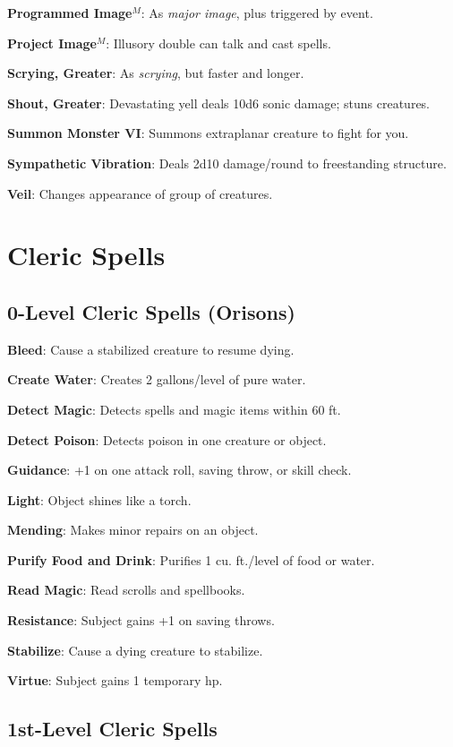 \textbf{Programmed Image}\(^{M}\): As \textit{major image}, plus triggered by event.

\textbf{Project Image}\(^{M}\): Illusory double can talk and cast spells.

\textbf{Scrying, Greater}: As \textit{scrying}, but faster and longer.

\textbf{Shout, Greater}: Devastating yell deals 10d6 sonic damage; stuns creatures.

\textbf{Summon Monster VI}: Summons extraplanar creature to fight for you.

\textbf{Sympathetic Vibration}: Deals 2d10 damage/round to freestanding structure.

\textbf{Veil}: Changes appearance of group of creatures.

\section{Cleric Spells}


\subsection{0-Level Cleric Spells (Orisons)}


\textbf{Bleed}: Cause a stabilized creature to resume dying.

\textbf{Create Water}: Creates 2 gallons/level of pure water.

\textbf{Detect Magic}: Detects spells and magic items within 60 ft.

\textbf{Detect Poison}: Detects poison in one creature or object.

\textbf{Guidance}: +1 on one attack roll, saving throw, or skill check.

\textbf{Light}: Object shines like a torch.

\textbf{Mending}: Makes minor repairs on an object.

\textbf{Purify Food and Drink}: Purifies 1 cu. ft./level of food or water.

\textbf{Read Magic}: Read scrolls and spellbooks.

\textbf{Resistance}: Subject gains +1 on saving throws.

\textbf{Stabilize}: Cause a dying creature to stabilize.

\textbf{Virtue}: Subject gains 1 temporary hp.

\subsection{1st-Level Cleric Spells}


